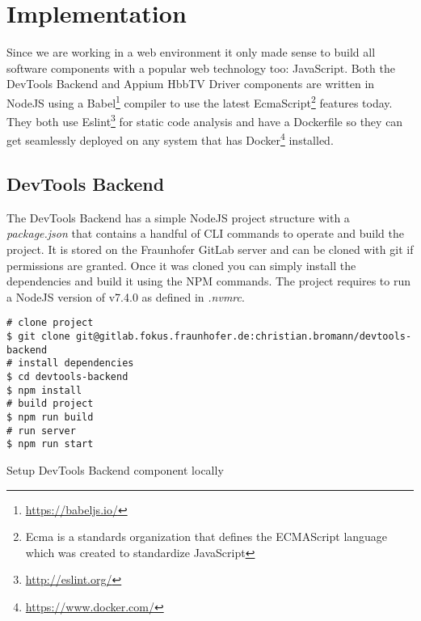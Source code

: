 %

\chapter{Implementation\label{cha:implementation}}

Since we are working in a web environment it only made sense to build all software components with a
popular web technology too: JavaScript. Both the DevTools Backend and Appium HbbTV Driver components
are written in NodeJS using a Babel\footnote{\url{https://babeljs.io/}} compiler to use the latest
EcmaScript\footnote{Ecma is a standards organization that defines the ECMAScript language which was created to standardize JavaScript} features today. They both use Eslint\footnote{\url{http://eslint.org/}} for static code
analysis and have a Dockerfile so they can get seamlessly deployed on any system that has Docker\footnote{\url{https://www.docker.com/}}
installed.

\section{DevTools Backend\label{sec:implDevtoolsBackend}}

The DevTools Backend has a simple NodeJS project structure with a \textit{package.json} that contains
a handful of CLI commands to operate and build the project. It is stored on the Fraunhofer GitLab
server and can be cloned with git if permissions are granted. Once it was cloned you can simply install
the dependencies and build it using the NPM commands. The project requires to run a NodeJS version
of v7.4.0 as defined in \textit{.nvmrc}.

\vspace{1cm}
\begin{listing}[H]
\begin{verbatim}
# clone project
$ git clone git@gitlab.fokus.fraunhofer.de:christian.bromann/devtools-backend
# install dependencies
$ cd devtools-backend
$ npm install
# build project
$ npm run build
# run server
$ npm run start
\end{verbatim}
\caption{Setup DevTools Backend component locally}
\label{lst:setupdevtools}
\end{listing}
\vspace{0.5cm}

